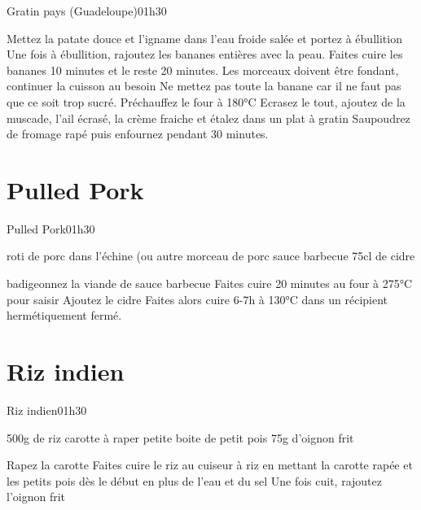 {\begin{recette}{Gratin pays (Guadeloupe)}{0}{1h30}{}
\begin{preparation}
\etape Mettez la patate douce et l'igname dans l'eau froide salée et portez à ébullition
\etape Une fois à ébullition, rajoutez les bananes entières avec la peau. Faites cuire les bananes 10 minutes et le reste 20 minutes. Les morceaux doivent être fondant, continuer la cuisson au besoin
\etape Ne mettez pas toute la banane car il ne faut pas que ce soit trop sucré. 
\etape Préchauffez le four à 180°C
\etape Ecrasez le tout, ajoutez de la muscade, l'ail écrasé, la crème fraiche et étalez dans un plat à gratin
\etape Saupoudrez de fromage rapé puis enfournez pendant 30 minutes.
\end{preparation}
\end{recette}

\section{Pulled Pork}
\begin{recette}{Pulled Pork}{0}{1h30}{}
\begin{ingredients}
\ingredient roti de porc dans l'échine (ou autre morceau de porc
\ingredient sauce barbecue
\ingredient 75cl de cidre
\end{ingredients}

\begin{preparation}
\etape badigeonnez la viande de sauce barbecue
\etape Faites cuire 20 minutes au four à 275°C pour saisir
\etape Ajoutez le cidre
\etape Faites alors cuire 6-7h à 130°C dans un récipient hermétiquement fermé.
\end{preparation}
\end{recette}

\section{Riz indien}
\begin{recette}{Riz indien}{0}{1h30}{}
\begin{ingredients}
\ingredient 500g de riz
 carotte à raper
\ingredient petite boite de petit pois
\ingredient 75g d'oignon frit
\end{ingredients}

\begin{preparation}
\etape Rapez la carotte
\etape Faites cuire le riz au cuiseur à riz en mettant la carotte rapée et les petits pois dès le début en plus de l'eau et du sel
\etape Une fois cuit, rajoutez l'oignon frit
\end{preparation}
\end{recette}

}
